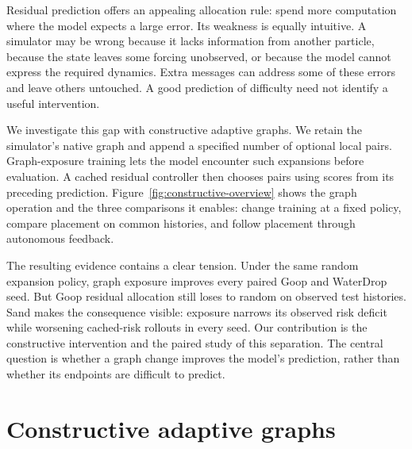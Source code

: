 Residual prediction offers an appealing allocation rule: spend more computation where the model expects a large error. Its weakness is equally intuitive. A simulator may be wrong because it lacks information from another particle, because the state leaves some forcing unobserved, or because the model cannot express the required dynamics. Extra messages can address some of these errors and leave others untouched. A good prediction of difficulty need not identify a useful intervention.

We investigate this gap with constructive adaptive graphs. We retain the simulator's native graph and append a specified number of optional local pairs. Graph-exposure training lets the model encounter such expansions before evaluation. A cached residual controller then chooses pairs using scores from its preceding prediction. Figure~\ref{fig:constructive-overview} shows the graph operation and the three comparisons it enables: change training at a fixed policy, compare placement on common histories, and follow placement through autonomous feedback.

The resulting evidence contains a clear tension. Under the same random expansion policy, graph exposure improves every paired Goop and WaterDrop seed. But Goop residual allocation still loses to random on observed test histories. Sand makes the consequence visible: exposure narrows its observed risk deficit while worsening cached-risk rollouts in every seed. Our contribution is the constructive intervention and the paired study of this separation. The central question is whether a graph change improves the model's prediction, rather than whether its endpoints are difficult to predict.


\section{Constructive adaptive graphs}
